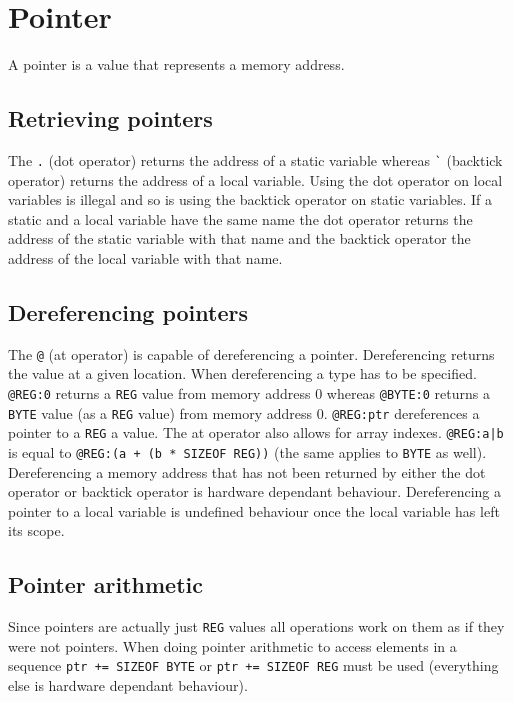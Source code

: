 \section{Pointer}

A pointer is a value that represents a memory address. 

\subsection{Retrieving pointers}

The \verb|.| (dot operator) returns the address of a static variable whereas \verb|`| (backtick operator) returns the address of a local variable. Using the dot operator
on local variables is illegal and so is using the backtick operator on static variables. If a static and a local variable have the same name the dot operator returns
the address of the static variable with that name and the backtick operator the address of the local variable with that name. 

\subsection{Dereferencing pointers}

The \verb|@| (at operator) is capable of dereferencing a pointer. Dereferencing returns the value at a given location. When dereferencing a type has to be specified.
\verb|@REG:0| returns a \verb|REG| value from memory address $0$ whereas \verb|@BYTE:0| returns a \verb|BYTE| value (as a \verb|REG| value) from memory address $0$.
\verb|@REG:ptr| dereferences a pointer to a \verb|REG| a value. The at operator also allows for array indexes. \verb?@REG:a|b? is equal to \verb?@REG:(a + (b * SIZEOF REG))? (the same applies to \verb|BYTE| as well). Dereferencing a memory address that has not been returned by either the dot operator or backtick operator is hardware dependant behaviour. Dereferencing a pointer to a local variable is undefined behaviour once the local variable has left its scope. 

\subsection{Pointer arithmetic}

Since pointers are actually just \verb|REG| values all operations work on them as if they were not pointers. When doing pointer arithmetic to access
elements in a sequence \verb|ptr += SIZEOF BYTE| or \verb|ptr += SIZEOF REG| must be used (everything else is hardware dependant behaviour). 

